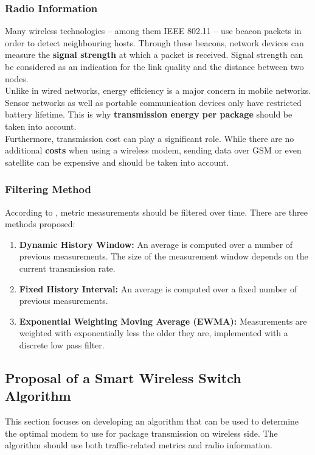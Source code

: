 \subsubsection{Radio Information}
Many wireless technologies – among them IEEE 802.11 – use beacon packets in order to detect neighbouring hosts. Through these beacons, network devices can measure the \textbf{signal strength} at which a packet is received. Signal strength can be considered as an indication for the link quality and the distance between two nodes.\\
Unlike in wired networks, energy efficiency is a major concern in mobile networks. Sensor networks
as well as portable communication devices only have restricted battery lifetime. This is why \textbf{transmission energy per package} should be taken into account.\\
Furthermore, transmission cost can play a significant role. While there are no additional \textbf{costs} when using a wireless modem, sending data over GSM or even satellite can be expensive and should be taken into account.
%
\subsubsection{Filtering Method} \label{subsec:txtFilteringMethod}
According to \cite{SurveyOnRoutingMetrics}, metric measurements should be filtered over time. There are three methods proposed:
\begin{enumerate}
    \item \textbf{Dynamic History Window:} An average is computed over a number of previous measurements. The size of the measurement window depends on the current transmission rate.
    \item \textbf{Fixed History Interval:} An average is computed over a fixed number of previous measurements.
    \item \textbf{Exponential Weighting Moving Average (EWMA):} Measurements are weighted with exponentially less the older they are, implemented with a discrete low pass filter.
\end{enumerate}
%
%
\subsection{Proposal of a Smart Wireless Switch Algorithm}
This section focuses on developing an algorithm that can be used to determine the optimal modem to use for package transmission on wireless side. The algorithm should use both traffic-related metrics and radio information.
%
